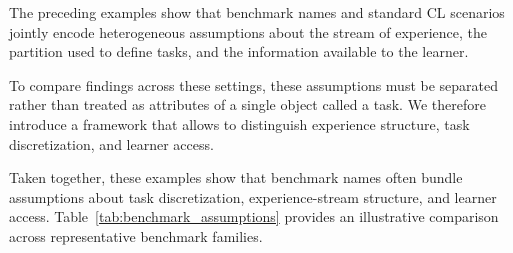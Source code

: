 \documentclass{article}
\begin{document}
        The preceding examples show that benchmark names and standard CL scenarios jointly encode heterogeneous assumptions about the stream of experience, the partition used to define tasks, and the information available to the learner. 
        
        To compare findings across these settings, these assumptions must be separated rather than treated as attributes of a single object called a task. We therefore introduce a framework that allows to distinguish experience structure, task discretization, and learner access.

        Taken together, these examples show that benchmark names often bundle assumptions about task discretization, experience-stream structure, and learner access. Table~\ref{tab:benchmark_assumptions} provides an illustrative comparison across representative benchmark families.
        
            \begin{table}[t]
                \centering
                \caption{Illustrative comparison of assumptions embedded in representative continual learning benchmarks.}
                \label{tab:benchmark_assumptions}
            \end{table}
\end{document}
